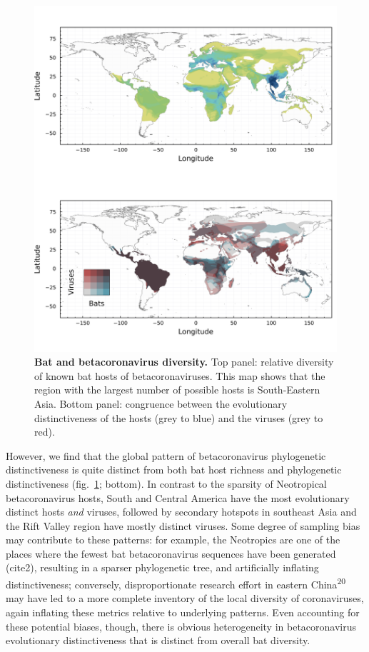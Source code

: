 \documentclass[11pt]{article}
\makeatletter
\def\maxwidth{\ifdim\Gin@nat@width>\linewidth\linewidth
\else\Gin@nat@width\fi}
\let\Oldincludegraphics\includegraphics
\renewcommand{\includegraphics}[1]{\Oldincludegraphics[width=\maxwidth]{#1}}
\makeatother
\begin{document}
\begin{figure}
\hypertarget{fig:richness}{%
\centering
\includegraphics{figures/combined_richness.png}
\caption{\textbf{Bat and betacoronavirus diversity.} Top panel: relative
diversity of known bat hosts of betacoronaviruses. This map shows that
the region with the largest number of possible hosts is South-Eastern
Asia. Bottom panel: congruence between the evolutionary distinctiveness
of the hosts (grey to blue) and the viruses (grey to
red).}\label{fig:richness}
}
\end{figure}

However, we find that the global pattern of betacoronavirus phylogenetic
distinctiveness is quite distinct from both bat host richness and
phylogenetic distinctiveness (fig.~\ref{fig:richness}; bottom). In
contrast to the sparsity of Neotropical betacoronavirus hosts, South and
Central America have the most evolutionary distinct hosts \emph{and}
viruses, followed by secondary hotspots in southeast Asia and the Rift
Valley region have mostly distinct viruses. Some degree of sampling bias
may contribute to these patterns: for example, the Neotropics are one of
the places where the fewest bat betacoronavirus sequences have been
generated (cite2), resulting in a sparser phylogenetic tree, and
artificially inflating distinctiveness; conversely, disproportionate
research effort in eastern China\textsuperscript{20} may have led to a
more complete inventory of the local diversity of coronaviruses, again
inflating these metrics relative to underlying patterns. Even accounting
for these potential biases, though, there is obvious heterogeneity in
betacoronavirus evolutionary distinctiveness that is distinct from
overall bat diversity.
\end{document}
